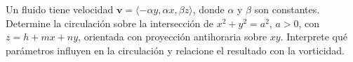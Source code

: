﻿Un fluido tiene velocidad $\mathbf v=\langle-\alpha y,\alpha x,\beta z\rangle$, donde $\alpha$ y $\beta$ son constantes. Determine la circulación sobre la intersección de $x^2+y^2=a^2$, $a>0$, con $z=h+mx+ny$, orientada con proyección antihoraria sobre $xy$. Interprete qué parámetros influyen en la circulación y relacione el resultado con la vorticidad.
